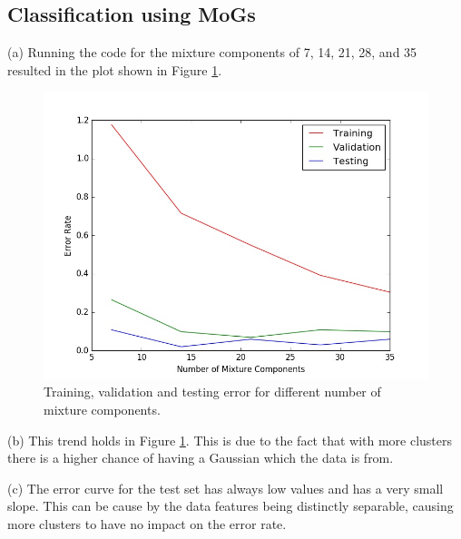 \documentclass[12pt]{article}
\begin{document}
\subsection{Classification using MoGs}
(a) Running the code for the mixture components of 7, 14, 21, 28, and 35 resulted in the plot shown in Figure \ref{f44a}. 

\begin{figure}[!htb]
\centering
\includegraphics[width=0.6\linewidth]{44/7.jpg}
\vspace{-0.1in}
\caption{Training, validation and testing error for different number of mixture components.}
\label{f44a}
\vspace{-0.1in}
\end{figure}

\vspace{.1in}

(b) This trend holds in Figure \ref{f44a}. This is due to the fact that with more clusters there is a higher chance of having a Gaussian which the data is from. 

\vspace{.1in}

(c) The error curve for the test set has always low values and has a very small slope. This can be cause by the data features being distinctly separable, causing more clusters to have no impact on the error rate.  
\end{document}
